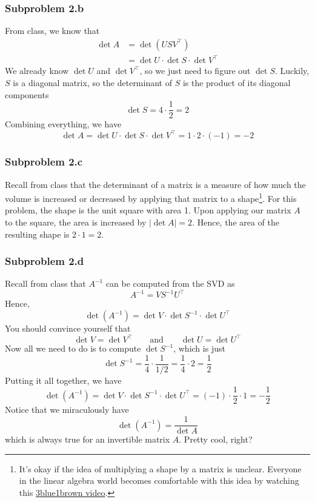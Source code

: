 \documentclass[11pt]{article}
\begin{document}
\subsubsection*{Subproblem 2.b}
From class, we know that
\begin{align*}
    \det A &= \det \left(USV^\top\right)\\
    &=\det U \cdot \det S \cdot \det V^\top
\end{align*}
We already know $\det U$ and $\det V^\top$, so we just need to figure out $\det S$. Luckily, $S$ is a diagonal matrix, so the determinant of $S$ is the product of its diagonal components 
\[
\det S = 4\cdot \frac{1}{2} = 2
\]
Combining everything, we have 
\[
\det A = \det U \cdot \det S \cdot \det V^\top = 1 \cdot 2 \cdot \left(-1\right) = -2
\]

\subsubsection*{Subproblem 2.c}
Recall from class that the determinant of a matrix is a measure of how much the volume is increased or decreased by applying that matrix to a shape\footnote{It's okay if the idea of multiplying a shape by a matrix is unclear. Everyone in the linear algebra world becomes comfortable with this idea by watching this \href{https://youtu.be/Ip3X9LOh2dk?si=zCiJtCJSDO9g8CV6}{3blue1brown video}.}. For this problem, the shape is the unit square with area 1. Upon applying our matrix $A$ to the square, the area is increased by $\lvert\det A\rvert=2$. Hence, the area of the resulting shape is $2\cdot 1 = 2$.

\subsubsection*{Subproblem 2.d}
Recall from class that $A^{-1}$ can be computed from the SVD as 
\[
A^{-1} = VS^{-1}U^\top
\]
Hence, 
\[
\det \left(A^{-1}\right) = \det V \cdot \det S^{-1} \cdot \det U^\top
\]
You should convince yourself that 
\[
\det V = \det V^\top \qquad\text{and}\qquad \det U = \det U^\top
\]
Now all we need to do is to compute $\det S^{-1}$, which is just 
\[
\det S^{-1} = \frac{1}{4}\cdot \frac{1}{1/2} = \frac{1}{4}\cdot 2 = \frac{1}{2}
\]
Putting it all together, we have 
\[
\det \left(A^{-1}\right) = \det V \cdot \det S^{-1} \cdot \det U^\top=\left(-1\right)\cdot \frac{1}{2}\cdot 1 = -\frac{1}{2}
\]
Notice that we miraculously have 
\[
\det \left(A^{-1}\right)  = \frac{1}{\det A}
\]
which is always true for an invertible matrix $A$. Pretty cool, right?
\end{document}
